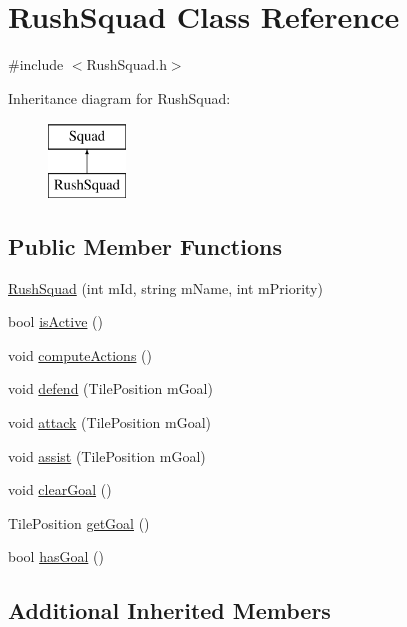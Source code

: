 \hypertarget{class_rush_squad}{\section{Rush\-Squad Class Reference}
\label{class_rush_squad}
}


{\ttfamily \#include $<$Rush\-Squad.\-h$>$}

Inheritance diagram for Rush\-Squad\-:\begin{figure}[H]
\begin{center}
\leavevmode
\includegraphics[height=2.000000cm]{class_rush_squad}
\end{center}
\end{figure}
\subsection*{Public Member Functions}
\begin{DoxyCompactItemize}
\item 
\hyperlink{class_rush_squad_ad5f111392247c4be3ab1fb9f7d19fb2e}{Rush\-Squad} (int m\-Id, string m\-Name, int m\-Priority)
\item 
bool \hyperlink{class_rush_squad_a5cc0121df4c3948c189de4a1ef40401d}{is\-Active} ()
\item 
void \hyperlink{class_rush_squad_a075afcb471c368c2315a42cedb58e84f}{compute\-Actions} ()
\item 
void \hyperlink{class_rush_squad_abd54cdfc77e3b32551fd27770313cfe7}{defend} (Tile\-Position m\-Goal)
\item 
void \hyperlink{class_rush_squad_ad2f77ce2e4af380cb66492a340fa535c}{attack} (Tile\-Position m\-Goal)
\item 
void \hyperlink{class_rush_squad_a5f19b2252ebe72769d11d79fe0de6646}{assist} (Tile\-Position m\-Goal)
\item 
void \hyperlink{class_rush_squad_a11d8bb67344e053598ae072234394811}{clear\-Goal} ()
\item 
Tile\-Position \hyperlink{class_rush_squad_afab5f8f1bdfad56a5d39ce257fc74753}{get\-Goal} ()
\item 
bool \hyperlink{class_rush_squad_a889e5b7adcb6621e5d3d97fc3136b94d}{has\-Goal} ()
\end{DoxyCompactItemize}
\subsection*{Additional Inherited Members}


